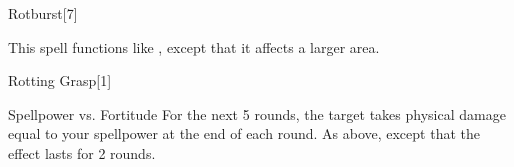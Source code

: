 \begin{spellsection}[Greater]{Rotburst}[7]
    \begin{spellheader}
    \end{spellheader}
    \begin{spellcontent}
        \begin{spelltargetinginfo}
        \end{spelltargetinginfo}
        \begin{spelleffects}
            \spellspecial This spell functions like , except that it affects a larger area.
        \end{spelleffects}
    \end{spellcontent}
    \begin{spellfooter}
        \miscastexplode
    \end{spellfooter}
\end{spellsection}

\begin{spellsection}{Rotting Grasp}[1]
    \begin{spellheader}
    \end{spellheader}
    \begin{spellcontent}
        \begin{spelltargetinginfo}
        \end{spelltargetinginfo}
        \begin{spelleffects}
            \begin{spellattack}{Spellpower vs. Fortitude}
                \spellsuccess For the next 5 rounds, the target takes physical damage equal to your spellpower at the end of each round.
                \spellfailure As above, except that the effect lasts for 2 rounds.
            \end{spellattack}
        \end{spelleffects}
    \end{spellcontent}
    \begin{spellfooter}
        \miscastexplode
    \end{spellfooter}
\end{spellsection}


